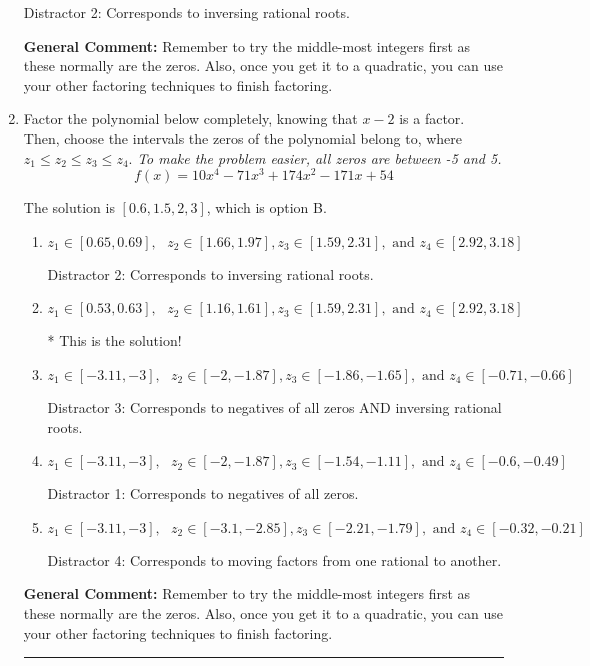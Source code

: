 \documentclass{extbook}[14pt]
\newcommand{\litem}[1]{\item #1

\rule{\textwidth}{0.4pt}}
\begin{document}
\begin{enumerate}
{\begin{enumerate}[label=\Alph*.]
 Distractor 2: Corresponds to inversing rational roots.
\end{enumerate}

\textbf{General Comment:} Remember to try the middle-most integers first as these normally are the zeros. Also, once you get it to a quadratic, you can use your other factoring techniques to finish factoring.
}
\litem{
Factor the polynomial below completely, knowing that $x-2$ is a factor. Then, choose the intervals the zeros of the polynomial belong to, where $z_1 \leq z_2 \leq z_3 \leq z_4$. \textit{To make the problem easier, all zeros are between -5 and 5.}
\[ f(x) = 10x^{4} -71 x^{3} +174 x^{2} -171 x + 54 \]

The solution is \( [0.6, 1.5, 2, 3] \), which is option B.\begin{enumerate}[label=\Alph*.]
\item \( z_1 \in [0.65, 0.69], \text{   }  z_2 \in [1.66, 1.97], z_3 \in [1.59, 2.31], \text{   and   } z_4 \in [2.92, 3.18] \)

 Distractor 2: Corresponds to inversing rational roots.
\item \( z_1 \in [0.53, 0.63], \text{   }  z_2 \in [1.16, 1.61], z_3 \in [1.59, 2.31], \text{   and   } z_4 \in [2.92, 3.18] \)

* This is the solution!
\item \( z_1 \in [-3.11, -3], \text{   }  z_2 \in [-2, -1.87], z_3 \in [-1.86, -1.65], \text{   and   } z_4 \in [-0.71, -0.66] \)

 Distractor 3: Corresponds to negatives of all zeros AND inversing rational roots.
\item \( z_1 \in [-3.11, -3], \text{   }  z_2 \in [-2, -1.87], z_3 \in [-1.54, -1.11], \text{   and   } z_4 \in [-0.6, -0.49] \)

 Distractor 1: Corresponds to negatives of all zeros.
\item \( z_1 \in [-3.11, -3], \text{   }  z_2 \in [-3.1, -2.85], z_3 \in [-2.21, -1.79], \text{   and   } z_4 \in [-0.32, -0.21] \)

 Distractor 4: Corresponds to moving factors from one rational to another.
\end{enumerate}

\textbf{General Comment:} Remember to try the middle-most integers first as these normally are the zeros. Also, once you get it to a quadratic, you can use your other factoring techniques to finish factoring.
}
\end{enumerate}
\end{document}
